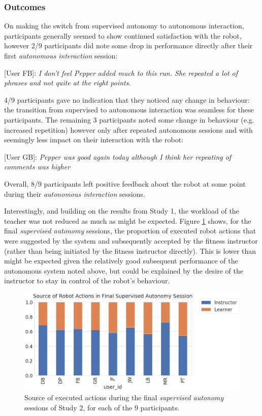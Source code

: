 \documentclass[manuscript, review, anonymous]{acmart}
\begin{document}
\subsubsection{Outcomes}

On making the switch from supervised autonomy to autonomous interaction, 
participants generally seemed to show continued satisfaction with the robot, however
2/9 participants did note some drop in performance directly after their first \textit{autonomous interaction}
session:

[User FB]: \textit{I don't feel Pepper added much to this run. She repeated a lot of phrases and not quite at the right points.}

4/9 participants gave no indication that they noticed any change in behaviour: the transition from supervised to autonomous interaction was seamless for these participants. The remaining 3 participants noted some change in behaviour (e.g. increased repetition) however only after repeated autonomous sessions and with seemingly less impact on their interaction with the robot:

[User GB]: \textit{Pepper was good again today although I think her repeating of comments was higher}

Overall, 8/9 participants left positive feedback about the robot at some point during their \textit{autonomous interaction} sessions. 

Interestingly, and building on the results from Study 1, the workload of the teacher was 
not reduced as much as might be expected. Figure \ref{fig:study2result} shows, for the final
\textit{supervised autonomy} sessions, the proportion of executed robot actions that were suggested by the system and subsequently accepted by the fitness instructor (rather than being initiated by the fitness instructor directly). This is lower than might be expected given the relatively good subsequent performance of the autonomous system noted above, but could be explained by the desire of the instructor to stay in control of the robot's behaviour.

\begin{figure}
  \centering
  \includegraphics[width=\linewidth]{figs/finalactionsource.png}
  \caption{Source of executed actions %
  during the final \textit{supervised autonomy} sessions of Study 2, for each of the 9 participants.} \label{fig:study2result}
\end{figure}
\end{document}
